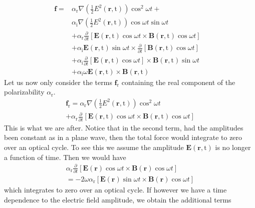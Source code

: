 \documentclass[twocolumn,english,pra,aps,superscriptaddress,floatfix]{revtex4-1}
\begin{document}
\begin{align}
\mathbf{f}=&\alpha_{\mathrm{r}}\nabla\left(\frac{1}{2}E^2(\mathbf{r},\mathrm{t})\right)\cos^2{\omega t}+& \nonumber \\
&\alpha_{\mathrm{i}}\nabla\left(\frac{1}{2}E^2(\mathbf{r},\mathrm{t})\right)\cos{\omega t}\sin{\omega t}& \nonumber \\
& +\alpha_{\mathrm{r}}\frac{\partial}{\partial t}\left[\mathbf{E}(\mathbf{r},\mathrm{t})\cos{\omega t}\times\mathbf{B}(\mathbf{r},\mathrm{t})\cos{\omega t}\right]& \nonumber \\
& +\alpha_{\mathrm{i}}\mathbf{E}(\mathbf{r},\mathrm{t})\sin{\omega t}\times\frac{\partial}{\partial t}\left[\mathbf{B}(\mathbf{r},\mathrm{t})\cos{\omega t}\right]& \nonumber \\
& +\alpha_{\mathrm{i}}\frac{\partial}{\partial t}\left[\mathbf{E}(\mathbf{r},\mathrm{t})\cos{\omega t}\right]\times\mathbf{B}(\mathbf{r},\mathrm{t})\sin{\omega t}& \nonumber \\
& +\alpha_{\mathrm{i}}\omega\mathbf{E}(\mathbf{r},\mathrm{t})\times\mathbf{B}(\mathbf{r},\mathrm{t})&
\end{align}
Let us now only consider the terms $\mathbf{f}_{\mathrm{r}}$ containing the real component of the polarizability $\alpha_{\mathrm{r}}$.  
\begin{align}
&\mathbf{f}_{\mathrm{r}}=\alpha_{\mathrm{r}}\nabla\left(\frac{1}{2}E^2(\mathbf{r},\mathrm{t})\right)\cos^2{\omega t}\\
& +\alpha_{\mathrm{r}}\frac{\partial}{\partial t}\left[\mathbf{E}(\mathbf{r},\mathrm{t})\cos{\omega t}\times\mathbf{B}(\mathbf{r},\mathrm{t})\cos{\omega t}\right]& 
\label{lorentzforceB}
\end{align}
This is what we are after. Notice that in the second term, had the amplitudes been constant as in a plane wave, then the total force would integrate to zero over an optical cycle.  To see this we assume the amplitude $\mathbf{E}(\mathbf{r},\mathrm{t})$ is no longer a function of time.  Then we would have
\begin{align}
&\alpha_{\mathrm{r}}\frac{\partial}{\partial t}\left[\mathbf{E}(\mathbf{r})\cos{\omega t}\times\mathbf{B}(\mathbf{r})\cos{\omega t}\right]& \nonumber \\
&=-2\omega\alpha_{\mathrm{r}}\left[\mathbf{E}(\mathbf{r})\sin{\omega t}\times\mathbf{B}(\mathbf{r})\cos{\omega t}\right]&
\label{lorentzforceC}
\end{align}
which integrates to zero over an optical cycle.  If however we have a time dependence to the electric field amplitude, we obtain the additional terms 
\end{document}
